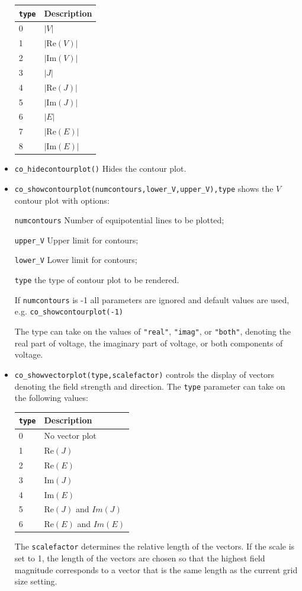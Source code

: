 \begin{itemize}
\begin{tabular}{ll}
\texttt{type} &  Description  \\ \hline
0 & $|V|$		\\
1 & $| \mbox{Re}(V)|$	\\
2 & $| \mbox{Im}(V)|$	\\
3 & $|J|$		\\
4 & $|\mbox{Re}(J)|$	\\
5 & $|\mbox{Im}(J)|$	\\
6 & $|E|$		\\
7 & $|\mbox{Re}(E)|$	\\
8 & $|\mbox{Im}(E)|$
\end{tabular}

\item \texttt{co\_hidecontourplot()} Hides the contour plot.

\item \texttt{co\_showcontourplot(numcontours,lower{\_}V,upper{\_}V),type} shows the
$V$ contour plot with options:

\texttt{numcontours} Number of equipotential lines to be plotted;

\texttt{upper{\_}V} Upper limit for contours;

\texttt{lower{\_}V} Lower limit for contours; 

\texttt{type} the type of contour plot to be rendered.

If \texttt{numcontours} is -1 all parameters are ignored and
default values are used, \\ e.g. \texttt{co\_showcontourplot(-1)}

The type can take on the values of {\tt "real"}, {\tt "imag"}, or {\tt "both"}, denoting
the real part of voltage, the imaginary part of voltage, or both components of voltage.

\item \texttt{co\_showvectorplot(type,scalefactor)}
controls the display of vectors denoting the field strength and
direction. The \texttt{type} parameter can take on the following values:

\begin{tabular}{ll}
\texttt{type} &  Description  \\ \hline
0 & No vector plot \\
1 & $\mbox{Re}(J)$ \\
2 & $\mbox{Re}(E)$ \\
3 & $\mbox{Im}(J)$ \\
4 & $\mbox{Im}(E)$ \\
5 & $\mbox{Re}(J)$ and $Im(J)$ \\
6 & $\mbox{Re}(E)$ and $Im(E)$
\end{tabular}
The \texttt{scalefactor}
determines the relative length of the vectors. If the scale is set
to 1, the length of the vectors are chosen so that the highest field
magnitude corresponds to a vector that is the same length as the
current grid size setting.


\end{itemize}
